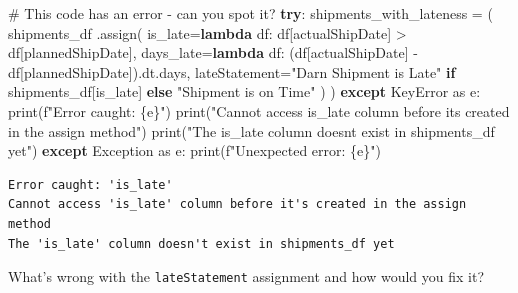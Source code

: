 \documentclass[
]{article}
\newenvironment{Shaded}{\begin{snugshade}}{\end{snugshade}}
\newcommand{\BuiltInTok}[1]{\textcolor[rgb]{0.00,0.23,0.31}{#1}}
\newcommand{\CommentTok}[1]{\textcolor[rgb]{0.37,0.37,0.37}{#1}}
\newcommand{\ControlFlowTok}[1]{\textcolor[rgb]{0.00,0.23,0.31}{\textbf{#1}}}
\newcommand{\ImportTok}[1]{\textcolor[rgb]{0.00,0.46,0.62}{#1}}
\newcommand{\KeywordTok}[1]{\textcolor[rgb]{0.00,0.23,0.31}{\textbf{#1}}}
\newcommand{\NormalTok}[1]{\textcolor[rgb]{0.00,0.23,0.31}{#1}}
\newcommand{\OperatorTok}[1]{\textcolor[rgb]{0.37,0.37,0.37}{#1}}
\newcommand{\PreprocessorTok}[1]{\textcolor[rgb]{0.68,0.00,0.00}{#1}}
\newcommand{\SpecialCharTok}[1]{\textcolor[rgb]{0.37,0.37,0.37}{#1}}
\newcommand{\SpecialStringTok}[1]{\textcolor[rgb]{0.13,0.47,0.30}{#1}}
\newcommand{\StringTok}[1]{\textcolor[rgb]{0.13,0.47,0.30}{#1}}
\begin{document}
\begin{tcolorbox}
\label{debug-this-code}
\begin{Shaded}
\begin{Highlighting}[]
\CommentTok{\# This code has an error {-} can you spot it?}
\ControlFlowTok{try}\NormalTok{:}
\NormalTok{    shipments\_with\_lateness }\OperatorTok{=}\NormalTok{ (}
\NormalTok{        shipments\_df}
\NormalTok{        .assign(}
\NormalTok{            is\_late}\OperatorTok{=}\KeywordTok{lambda}\NormalTok{ df: df[}\StringTok{\textquotesingle{}actualShipDate\textquotesingle{}}\NormalTok{] }\OperatorTok{\textgreater{}}\NormalTok{ df[}\StringTok{\textquotesingle{}plannedShipDate\textquotesingle{}}\NormalTok{],}
\NormalTok{            days\_late}\OperatorTok{=}\KeywordTok{lambda}\NormalTok{ df: (df[}\StringTok{\textquotesingle{}actualShipDate\textquotesingle{}}\NormalTok{] }\OperatorTok{{-}}\NormalTok{ df[}\StringTok{\textquotesingle{}plannedShipDate\textquotesingle{}}\NormalTok{]).dt.days,}
\NormalTok{            lateStatement}\OperatorTok{=}\StringTok{"Darn Shipment is Late"} \ControlFlowTok{if}\NormalTok{ shipments\_df[}\StringTok{\textquotesingle{}is\_late\textquotesingle{}}\NormalTok{] }\ControlFlowTok{else} \StringTok{"Shipment is on Time"}
\NormalTok{        )}
\NormalTok{    )}
\ControlFlowTok{except} \PreprocessorTok{KeyError} \ImportTok{as}\NormalTok{ e:}
    \BuiltInTok{print}\NormalTok{(}\SpecialStringTok{f"Error caught: }\SpecialCharTok{\{}\NormalTok{e}\SpecialCharTok{\}}\SpecialStringTok{"}\NormalTok{)}
    \BuiltInTok{print}\NormalTok{(}\StringTok{"Cannot access \textquotesingle{}is\_late\textquotesingle{} column before it\textquotesingle{}s created in the assign method"}\NormalTok{)}
    \BuiltInTok{print}\NormalTok{(}\StringTok{"The \textquotesingle{}is\_late\textquotesingle{} column doesn\textquotesingle{}t exist in shipments\_df yet"}\NormalTok{)}
\ControlFlowTok{except} \PreprocessorTok{Exception} \ImportTok{as}\NormalTok{ e:}
    \BuiltInTok{print}\NormalTok{(}\SpecialStringTok{f"Unexpected error: }\SpecialCharTok{\{}\NormalTok{e}\SpecialCharTok{\}}\SpecialStringTok{"}\NormalTok{)}
\end{Highlighting}
\end{Shaded}

\begin{verbatim}
Error caught: 'is_late'
Cannot access 'is_late' column before it's created in the assign method
The 'is_late' column doesn't exist in shipments_df yet
\end{verbatim}

What's wrong with the \texttt{lateStatement} assignment and how would
you fix it?

\end{tcolorbox}
\end{document}
